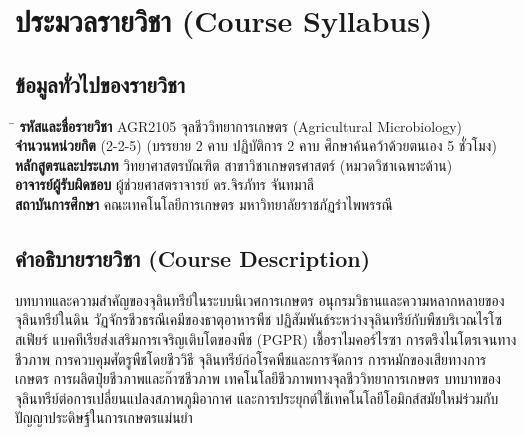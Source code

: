 \chapter*{ประมวลรายวิชา (Course Syllabus)}

\section*{ข้อมูลทั่วไปของรายวิชา}
\begin{tabbing}
\hspace{4.0cm}\=\kill
\textbf{รหัสและชื่อรายวิชา} \> AGR2105 จุลชีววิทยาการเกษตร (Agricultural Microbiology)\\
\textbf{จำนวนหน่วยกิต} (2-2-5) (บรรยาย 2 คาบ ปฏิบัติการ 2 คาบ ศึกษาค้นคว้าด้วยตนเอง 5 ชั่วโมง)\\
\textbf{หลักสูตรและประเภท} \> วิทยาศาสตรบัณฑิต สาขาวิชาเกษตรศาสตร์ (หมวดวิชาเฉพาะด้าน)\\
\textbf{อาจารย์ผู้รับผิดชอบ} \> ผู้ช่วยศาสตราจารย์ ดร.จิรภัทร จันทมาลี\\
\textbf{สถาบันการศึกษา} \> คณะเทคโนโลยีการเกษตร มหาวิทยาลัยราชภัฏรำไพพรรณี
\end{tabbing}

\section*{คำอธิบายรายวิชา (Course Description)}
บทบาทและความสำคัญของจุลินทรีย์ในระบบนิเวศการเกษตร อนุกรมวิธานและความหลากหลายของจุลินทรีย์ในดิน วัฏจักรชีวธรณีเคมีของธาตุอาหารพืช ปฏิสัมพันธ์ระหว่างจุลินทรีย์กับพืชบริเวณไรโซสเฟียร์ แบคทีเรียส่งเสริมการเจริญเติบโตของพืช (PGPR) เชื้อราไมคอร์ไรซา การตรึงไนโตรเจนทางชีวภาพ การควบคุมศัตรูพืชโดยชีววิธี จุลินทรีย์ก่อโรคพืชและการจัดการ การหมักของเสียทางการเกษตร การผลิตปุ๋ยชีวภาพและก๊าซชีวภาพ เทคโนโลยีชีวภาพทางจุลชีววิทยาการเกษตร บทบาทของจุลินทรีย์ต่อการเปลี่ยนแปลงสภาพภูมิอากาศ และการประยุกต์ใช้เทคโนโลยีโอมิกส์สมัยใหม่ร่วมกับปัญญาประดิษฐ์ในการเกษตรแม่นยำ

